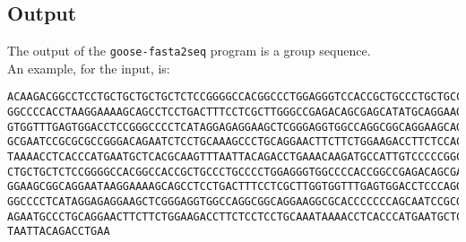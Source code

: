 \subsection*{Output}

The output of the \texttt{goose-fasta2seq} program is a group sequence. \\
An example, for the input, is:
\begin{lstlisting}
ACAAGACGGCCTCCTGCTGCTGCTGCTCTCCGGGGCCACGGCCCTGGAGGGTCCACCGCTGCCCTGCTGCCATTGTCCCC
GGCCCCACCTAAGGAAAAGCAGCCTCCTGACTTTCCTCGCTTGGGCCGAGACAGCGAGCATATGCAGGAAGCGGCAGGAA
GTGGTTTGAGTGGACCTCCGGGCCCCTCATAGGAGAGGAAGCTCGGGAGGTGGCCAGGCGGCAGGAAGCAGGCCAGTGCC
GCGAATCCGCGCGCCGGGACAGAATCTCCTGCAAAGCCCTGCAGGAACTTCTTCTGGAAGACCTTCTCCACCCCCCCAGC
TAAAACCTCACCCATGAATGCTCACGCAAGTTTAATTACAGACCTGAAACAAGATGCCATTGTCCCCCGGCCTCCTGCTG
CTGCTGCTCTCCGGGGCCACGGCCACCGCTGCCCTGCCCCTGGAGGGTGGCCCCACCGGCCGAGACAGCGAGCATATGCA
GGAAGCGGCAGGAATAAGGAAAAGCAGCCTCCTGACTTTCCTCGCTTGGTGGTTTGAGTGGACCTCCCAGGCCAGTGCCG
GGCCCCTCATAGGAGAGGAAGCTCGGGAGGTGGCCAGGCGGCAGGAAGGCGCACCCCCCCAGCAATCCGCGCGCCGGGAC
AGAATGCCCTGCAGGAACTTCTTCTGGAAGACCTTCTCCTCCTGCAAATAAAACCTCACCCATGAATGCTCACGCAAGTT
TAATTACAGACCTGAA
\end{lstlisting}
